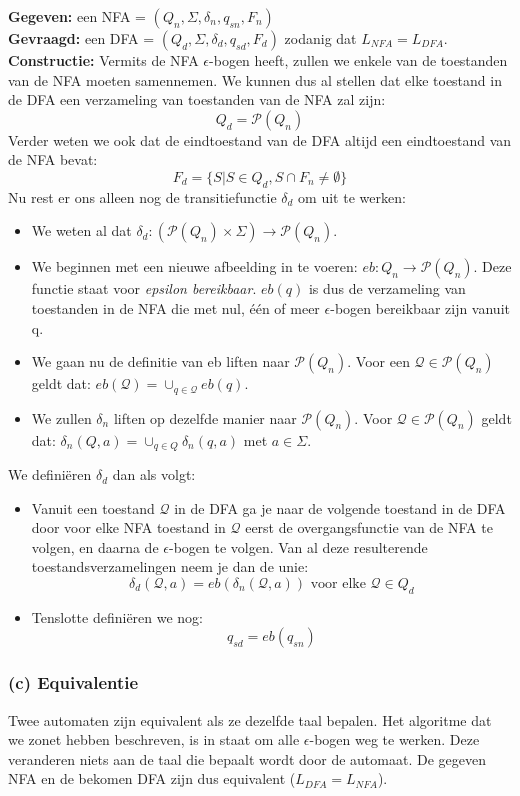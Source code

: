 \textbf{Gegeven:} een NFA = $(Q_n, \Sigma, \delta_n, q_{sn}, F_n)$ \\
\textbf{Gevraagd:} een DFA = $(Q_d, \Sigma, \delta_d, q_{sd}, F_d)$ zodanig dat $L_{NFA}=L_{DFA}$.\\
\textbf{Constructie:} Vermits de NFA $\epsilon$-bogen heeft, zullen we enkele van de toestanden van de NFA moeten samennemen. We kunnen dus al stellen dat elke toestand in de DFA een verzameling van toestanden van de NFA zal zijn:
$$ Q_d =  \mathcal{P}(Q_n)$$
Verder weten we ook dat de eindtoestand van de DFA altijd een eindtoestand van de NFA bevat:
$$ F_d = \{S | S \in Q_d, S \cap F_n \neq \emptyset \}  $$
Nu rest er ons alleen nog de transitiefunctie $\delta_d$ om uit te werken:
\begin{itemize}
\item We weten al dat $\delta_d : (\mathcal{P} (Q_n) \times \Sigma) \rightarrow \mathcal{P}(Q_n)$.
\item We beginnen met een nieuwe afbeelding in te voeren: $eb: Q_n \rightarrow \mathcal{P}(Q_n)$. Deze functie staat voor \emph{epsilon bereikbaar}. $eb(q)$ is dus de verzameling van toestanden in de NFA die met nul, \'e\'en of meer $\epsilon$-bogen bereikbaar zijn vanuit q.
\item We gaan nu de definitie van eb liften naar $\mathcal{P}(Q_n)$. Voor een $\mathcal{Q} \in \mathcal{P}(Q_n)$ geldt dat: $eb(\mathcal{Q}) = \cup_{q \in \mathcal{Q}} eb(q)$.
\item We zullen $\delta_n$ liften op dezelfde manier naar $\mathcal{P}(Q_n)$. Voor $\mathcal{Q} \in \mathcal{P}(Q_n)$ geldt dat: $\delta_n(Q,a) = \cup_{q \in Q}\delta_n(q,a)$ met $a \in \Sigma$. 
\end{itemize}
We defini\"eren $\delta_d$ dan als volgt:
\begin{itemize}
\item Vanuit een toestand $\mathcal{Q}$ in de DFA ga je naar de volgende toestand in de DFA door voor elke NFA toestand in $\mathcal{Q}$ eerst de overgangsfunctie van de NFA te volgen, en daarna de $\epsilon$-bogen te volgen. Van al deze resulterende toestandsverzamelingen neem je dan de unie:
$$ \delta_d(\mathcal{Q},a) = eb(\delta_n(\mathcal{Q},a)) \text{ voor elke } \mathcal{Q} \in Q_d $$
\item Tenslotte defini\"eren we nog:
$$ q_{sd} = eb(q_{sn}) $$
\end{itemize}

\subsubsection*{(c) Equivalentie}
Twee automaten zijn equivalent als ze dezelfde taal bepalen. Het algoritme dat we zonet hebben beschreven, is in staat om alle $\epsilon$-bogen weg te werken. Deze veranderen niets aan de taal die bepaalt wordt door de automaat. De gegeven NFA en de bekomen DFA zijn dus equivalent ($L_{DFA} = L_{NFA}$).

